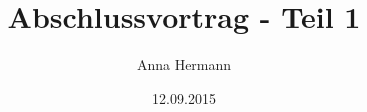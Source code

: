 \documentclass[12pt]{beamer}            %
\author{Anna Hermann}
\title{Abschlussvortrag - Teil 1}
\subtitle{}
\date{12.09.2015}
\begin{document}

\begin{frame}
    \begin{figure}[ht]
    \centering
    \def\svgwidth{0.9\columnwidth}
    
  \end{figure}
\end{frame}

\begin{frame}
    \begin{figure}[ht]
    \centering
    \def\svgwidth{0.9\columnwidth}
    
  \end{figure}
\end{frame}

\begin{frame}
    \begin{figure}[ht]
    \centering
    \def\svgwidth{0.9\columnwidth}
    
  \end{figure}
\end{frame}

\begin{frame}
\begin{figure}[ht]
    \centering
    \def\svgwidth{.99\columnwidth}
    {}
    \hfill
    \def\svgwidth{.33\columnwidth}
    {}
    \end{figure}
\end{frame}

\begin{frame}
    \begin{figure}[ht]
    \centering
    \def\svgwidth{0.7\columnwidth}
    
  \end{figure}
\end{frame}
\end{document}
